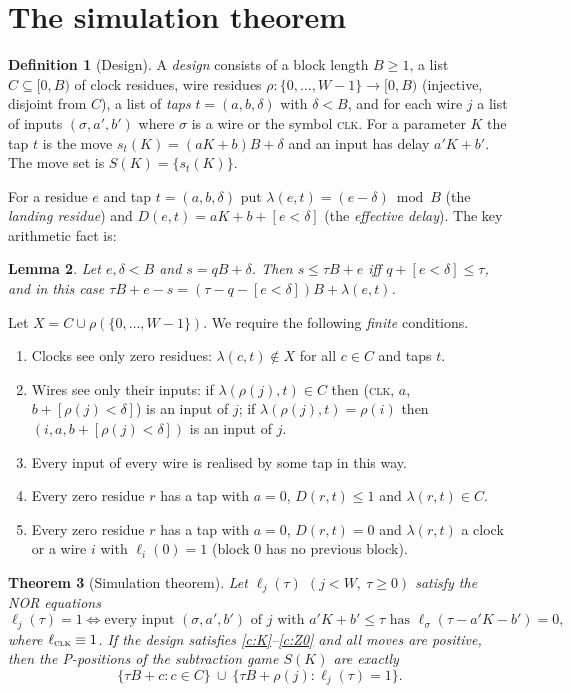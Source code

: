 \documentclass[11pt]{article}
\newtheorem{theorem}{Theorem}
\newtheorem{lemma}[theorem]{Lemma}
\theoremstyle{definition}
\newtheorem{definition}[theorem]{Definition}
\begin{document}
\section{The simulation theorem}\label{sec:sim}

\begin{definition}[Design]
A \emph{design} consists of a block length $B\ge 1$, a list $C\subseteq[0,B)$ of clock residues,
wire residues $\rho:\{0,\dots,W-1\}\to[0,B)$ (injective, disjoint from $C$), a list of \emph{taps}
$t=(a,b,\delta)$ with $\delta<B$, and for each wire $j$ a list of inputs $(\sigma,a',b')$ where
$\sigma$ is a wire or the symbol \textsc{clk}.  For a parameter $K$ the tap $t$ is the move
$s_t(K)=(aK+b)B+\delta$ and an input has delay $a'K+b'$.  The move set is $S(K)=\{s_t(K)\}$.
\end{definition}

For a residue $e$ and tap $t=(a,b,\delta)$ put $\lambda(e,t)=(e-\delta)\bmod B$ (the \emph{landing
residue}) and $D(e,t)=aK+b+[e<\delta]$ (the \emph{effective delay}).  The key arithmetic fact is:

\begin{lemma}\label{lem:arith}
Let $e,\delta<B$ and $s=qB+\delta$.  Then $s\le \tau B+e$ iff $q+[e<\delta]\le\tau$, and in this
case $\tau B+e-s=(\tau-q-[e<\delta])B+\lambda(e,t)$.
\end{lemma}

Let $X=C\cup\rho(\{0,\dots,W-1\})$.  We require the following \emph{finite} conditions.
\begin{enumerate}[label=(\textbf{\Alph*})]
\item\label{c:K} Clocks see only zero residues: $\lambda(c,t)\notin X$ for all $c\in C$ and taps $t$.
\item\label{c:W} Wires see only their inputs: if $\lambda(\rho(j),t)\in C$ then (\textsc{clk}, $a$,
$b+[\rho(j)<\delta]$) is an input of $j$; if $\lambda(\rho(j),t)=\rho(i)$ then $(i,a,b+[\rho(j)<\delta])$ is
an input of $j$.
\item\label{c:W2} Every input of every wire is realised by some tap in this way.
\item\label{c:Z1} Every zero residue $r$ has a tap with $a=0$, $D(r,t)\le 1$ and $\lambda(r,t)\in C$.
\item\label{c:Z0} Every zero residue $r$ has a tap with $a=0$, $D(r,t)=0$ and $\lambda(r,t)$ a clock or a
wire $i$ with $\ell_i(0)=1$ (block $0$ has no previous block).
\end{enumerate}

\begin{theorem}[Simulation theorem]\label{thm:sim}
Let $\ell_j(\tau)$ $(j<W,\ \tau\ge 0)$ satisfy the NOR equations
\[\ell_j(\tau)=1\iff \text{every input }(\sigma,a',b')\text{ of }j\text{ with }a'K+b'\le\tau
\text{ has }\ell_\sigma(\tau-a'K-b')=0,\]
where $\ell_{\textsc{clk}}\equiv 1$.  If the design satisfies \ref{c:K}--\ref{c:Z0} and all moves
are positive, then the P-positions of the subtraction game $S(K)$ are exactly
\[\{\tau B+c: c\in C\}\ \cup\ \{\tau B+\rho(j): \ell_j(\tau)=1\}.\]
\end{theorem}
\end{document}
